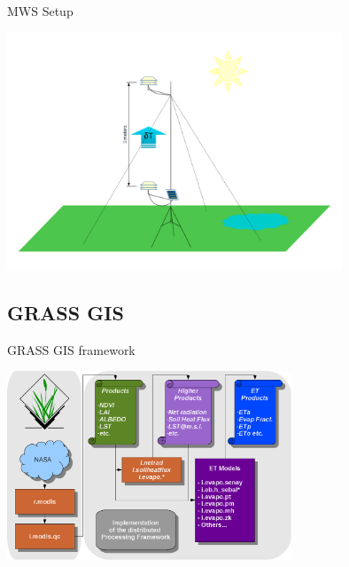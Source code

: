 \documentclass[xcolor=dvipsnames,beamer]{beamer} %
\begin{document}
\begin{frame}[fragile]{MWS Setup}

\begin{center}
 \includegraphics[width=10cm]{MWS_v1_deltaT_sketch_cold}
\end{center}

\end{frame}

\subsection{GRASS GIS}
\begin{frame}[fragile]{GRASS GIS framework}

\begin{center}
 \includegraphics[width=8.5cm]{architecture_implementation}
\end{center}

\end{frame}
\end{document}
